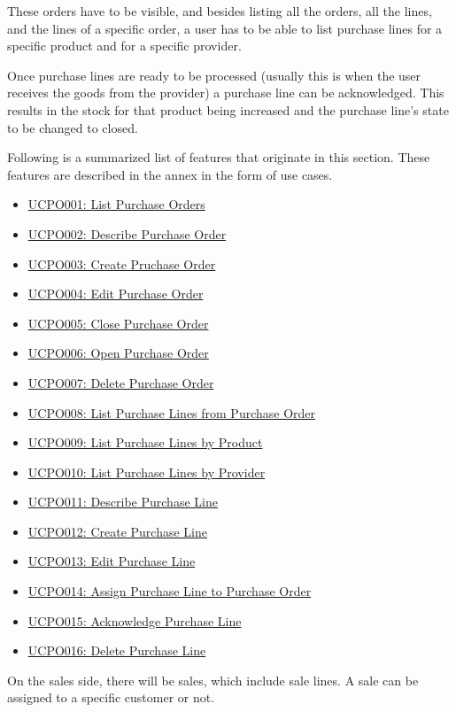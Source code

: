 These orders have to be visible, and besides listing all the orders, all the lines, and the lines of a specific order, a user has to be able to list purchase lines for a specific product and for a specific provider.

Once purchase lines are ready to be processed (usually this is when the user receives the goods from the provider) a purchase line can be acknowledged. This results in the stock for that product being increased and the purchase line’s state to be changed to closed.

Following is a summarized list of features that originate in this section. These features are described in the annex in the form of use cases.
\hfill\break
\begin{itemize}
\item \hyperref[UCPO001]{UCPO001: List Purchase Orders}
\item \hyperref[UCPO002]{UCPO002: Describe Purchase Order}
\item \hyperref[UCPO003]{UCPO003: Create Pruchase Order}
\item \hyperref[UCPO004]{UCPO004: Edit Purchase Order}
\item \hyperref[UCPO005]{UCPO005: Close Purchase Order}
\item \hyperref[UCPO006]{UCPO006: Open Purchase Order}
\item \hyperref[UCPO007]{UCPO007: Delete Purchase Order}
\item \hyperref[UCPO008]{UCPO008: List Purchase Lines from Purchase Order}
\item \hyperref[UCPO009]{UCPO009: List Purchase Lines by Product}
\item \hyperref[UCPO010]{UCPO010: List Purchase Lines by Provider}
\item \hyperref[UCPO011]{UCPO011: Describe Purchase Line}
\item \hyperref[UCPO012]{UCPO012: Create Purchase Line}
\item \hyperref[UCPO013]{UCPO013: Edit Purchase Line}
\item \hyperref[UCPO014]{UCPO014: Assign Purchase Line to Purchase Order}
\item \hyperref[UCPO015]{UCPO015: Acknowledge Purchase Line}
\item \hyperref[UCPO016]{UCPO016: Delete Purchase Line}
\end{itemize}
\hfill\break
On the sales side, there will be sales, which include sale lines. A sale can be assigned to a specific customer or not.

